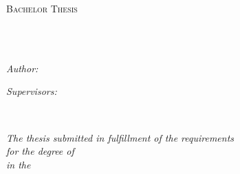 \documentclass[
11pt, %
english, %
singlespacing, %
headsepline, %
oneside,]{BachelorMasterThesis} %
\author{Myroslava \textsc{Romaniuk}} %
\begin{document}
\frontmatter %

\pagestyle{plain} %


\begin{titlepage}
\begin{center}

\vspace*{.06\textheight}
{\scshape\LARGE \univname\par}\vspace{1.5cm} %
\textsc{\Large Bachelor Thesis}\\[0.5cm] %

\HRule \\[0.4cm] %
{\huge \bfseries \ttitle\par}\vspace{0.4cm} %
\HRule \\[1.5cm] %
 
\begin{minipage}[t]{0.4\textwidth}
\begin{flushleft} \large
\emph{Author:}\\
\authorname %
\end{flushleft}
\end{minipage}
\begin{minipage}[t]{0.4\textwidth}
\begin{flushright} \large
\emph{Supervisors:} \\
\supname %
\end{flushright}
\end{minipage}\\[3cm]
 
\vfill

\large \textit{The thesis submitted in fulfillment of the requirements\\ for the degree of \degreename}\\[0.3cm] %
\textit{in the}\\[0.4cm]
\groupname\\\deptname\\[1cm] %
 

\end{center}
\end{titlepage}
\end{document}
